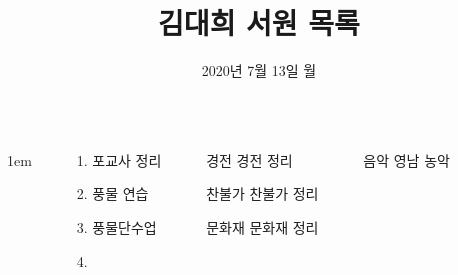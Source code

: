 \documentclass[25pt, a1paper ]{tikzposter}
\title{김대희 서원 목록 }
\author{ 2020년 7월 13일 월 }
\begin{document}
	\maketitle

	\begin{columns}
			{
					\setlength{\leftmargini}{7em}
					\setlength{\labelsep} {1em}
				\begin{LARGE}
					\begin{itemize}
					\item [1.] 포교사 정리
					\item [2.] 풍물 연습
					\item [3.] 풍물단수업
					\item [4.] 
					\end{itemize}
				\end{LARGE}
			}





		{
			\setlength{\leftmargini}{7em}			
			\setlength{\labelsep}{1em} %
			\begin{LARGE}
			\begin{itemize}
			\item [경전] 경전 정리
			\item [찬불가] 찬불가 정리
			\item [문화재] 문화재 정리

			\end{itemize}
			\end{LARGE}
		}		


		{
			\setlength{\leftmargini}{7em}			
			\setlength{\labelsep}{1em} %
			\begin{LARGE}
			\begin{itemize}
			\item [음악] 영남 농악
			\end{itemize}
			\end{LARGE}
		}	%







\end{columns}
\end{document}
